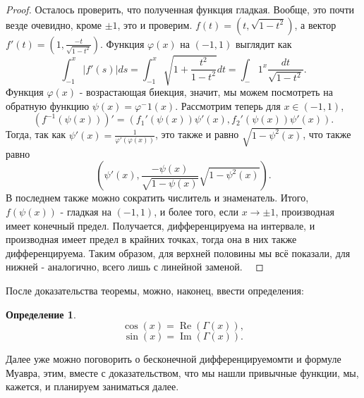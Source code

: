 \documentclass[a4paper,100pt]{article}
\theoremstyle{indented}
\theoremstyle{definition}
\newtheorem{defn}{Определение}
\theoremstyle{remark}
\DeclareMathOperator{\Imf}{Im}
\DeclareMathOperator{\Real}{Re}
\begin{document}
\begin{proof}
    Осталось проверить, что полученная функция гладкая. Вообще, это почти везде очевидно, кроме $\pm 1$, это и проверим. $f(t)=(t, \sqrt{1-t^2})$, а вектор $f'(t)=(1, \frac{-t}{\sqrt{1-t^2}})$. Функция $\varphi(x)$ на $(-1, 1)$ выглядит как
    \[
        \int_{-1}^x|f'(s)|ds=\int_{-1}^x\sqrt{1+\frac{t^2}{1-t^2}}dt=\int_-1^x\frac{dt}{\sqrt{1-t^2}}.
    \]
    Функция $\varphi(x)$ - возрастающая биекция, значит, мы можем посмотреть на обратную функцию $\psi(x)=\varphi^-1(x)$. Рассмотрим теперь для $x\in(-1, 1)$,
    \[
         (f^{-1}(\psi(x)))'=(f_1'(\psi(x))\psi'(x), f_2'(\psi(x))\psi'(x)).
    \]
    Тогда, так как $\psi'(x)=\frac{1}{\varphi'(\varphi(x))}$, это также и равно $\sqrt{1-\psi^2(x)}$, что также равно 
    \[
    (\psi'(x), \frac{-\psi(x)}{\sqrt{1-\psi(x)}}\sqrt{1-\psi^2(x)}).
    \]
    В последнем также можно сократить числитель и знаменатель. Итого, $f(\psi(x))$ - гладкая на $(-1, 1)$, и более того, если $x\rightarrow\pm 1$, производная имеет конечный предел. Получается, дифференцируема на интервале, и производная имеет предел в крайних точках, тогда она в них также дифференцируема. Таким образом, для верхней половины мы всё показали, для нижней - аналогично, всего лишь с линейной заменой. \ 


\end{proof}

После доказательства теоремы, можно, наконец, ввести определения:

\begin{defn}
    \[
        \cos(x)=\Real(\Gamma(x)), 
    \]
    \[
        \sin(x)=\Imf(\Gamma(x)).
    \]
\end{defn}

Далее уже можно поговорить о бесконечной дифференцируемомти и формуле Муавра, этим, вместе с доказательством, что мы нашли привычные функции, мы, кажется, и планируем заниматься далее.
\end{document}

